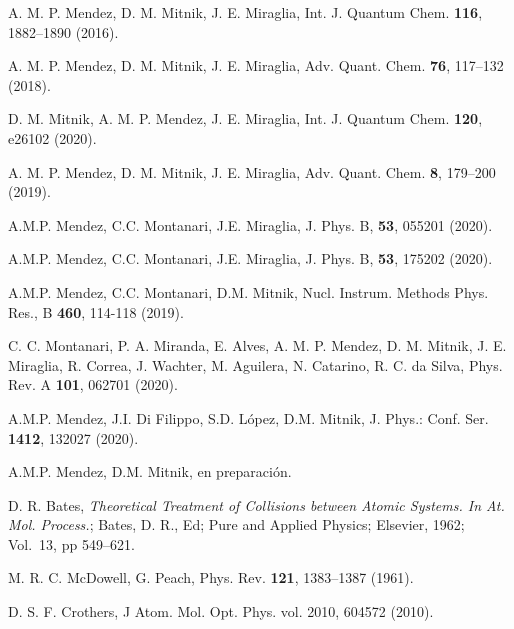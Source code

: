 
\begin{thebibliography}{9}

A. M. P. Mendez, D. M. Mitnik, J. E. Miraglia, 
Int. J. Quantum Chem. \textbf{116}, 1882--1890 (2016).

A. M. P. Mendez, D. M. Mitnik, J. E. Miraglia, 
Adv. Quant. Chem. \textbf{76}, 117--132 (2018).

D. M. Mitnik, A. M. P. Mendez, J. E. Miraglia, 
Int. J. Quantum Chem. \textbf{120}, e26102 (2020).

A. M. P. Mendez, D. M. Mitnik, J. E. Miraglia, 
Adv. Quant. Chem. \textbf{8}, 179--200 (2019).

A.M.P. Mendez, C.C. Montanari, J.E. Miraglia,
J. Phys. B, \textbf{53}, 055201 (2020).

A.M.P. Mendez, C.C. Montanari, J.E. Miraglia,
J. Phys. B, \textbf{53}, 175202 (2020). 

A.M.P. Mendez, C.C. Montanari, D.M. Mitnik, 
Nucl. Instrum. Methods Phys. Res., B \textbf{460}, 114-118 (2019).

C. C. Montanari, P. A. Miranda, E. Alves, A. M. P. Mendez,
D. M. Mitnik, J. E. Miraglia, R. Correa, J. Wachter, M. Aguilera, 
N. Catarino, R. C. da Silva,
Phys. Rev. A \textbf{101}, 062701 (2020). 

A.M.P. Mendez, J.I. Di Filippo, S.D. López, D.M. Mitnik,
J. Phys.: Conf. Ser. \textbf{1412}, 132027 (2020).

A.M.P. Mendez, D.M. Mitnik, en preparación.



D. R. Bates, 
\textit{Theoretical Treatment of Collisions between Atomic Systems.
In At. Mol. Process.};
Bates, D. R., Ed;
Pure and Applied Physics;
Elsevier, 1962;
Vol.~13, pp 549--621.

M. R. C. McDowell, G. Peach, 
Phys. Rev. \textbf{121}, 1383--1387 (1961).

D. S. F. Crothers,
J Atom. Mol. Opt. Phys. vol. 2010, 604572 (2010).


\end{thebibliography}
